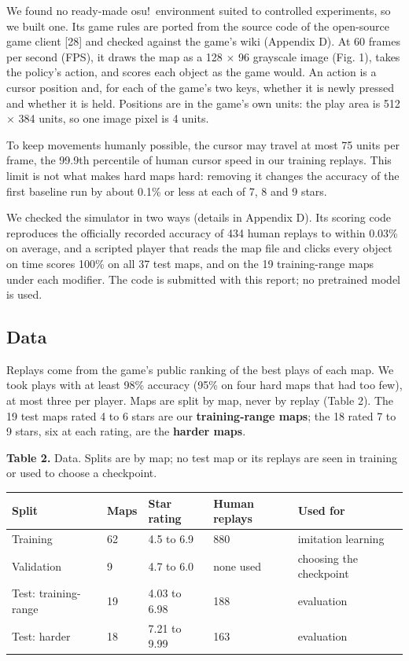 \documentclass[10pt,a4paper]{article}
\begin{document}
We found no ready-made osu!\ environment suited to controlled experiments, so we built one. Its game rules are ported from the source code of the open-source game client [28] and checked against the game's wiki (Appendix D). At 60 frames per second (FPS), it draws the map as a 128 $\times$ 96 grayscale image (Fig. 1), takes the policy's action, and scores each object as the game would. An action is a cursor position and, for each of the game's two keys, whether it is newly pressed and whether it is held. Positions are in the game's own units: the play area is 512 $\times$ 384 units, so one image pixel is 4 units.


To keep movements humanly possible, the cursor may travel at most 75 units per frame, the 99.9th percentile of human cursor speed in our training replays. This limit is not what makes hard maps hard: removing it changes the accuracy of the first baseline run by about 0.1\% or less at each of 7, 8 and 9 stars.


We checked the simulator in two ways (details in Appendix D). Its scoring code reproduces the officially recorded accuracy of 434 human replays to within 0.03\% on average, and a scripted player that reads the map file and clicks every object on time scores 100\% on all 37 test maps, and on the 19 training-range maps under each modifier. The code is submitted with this report; no pretrained model is used.


\subsection{Data}

Replays come from the game's public ranking of the best plays of each map. We took plays with at least 98\% accuracy (95\% on four hard maps that had too few), at most three per player. Maps are split by map, never by replay (Table 2). The 19 test maps rated 4 to 6 stars are our \textbf{training-range maps}; the 18 rated 7 to 9 stars, six at each rating, are the \textbf{harder maps}.


\begin{table}[!htb]\raggedright {\small \textbf{Table 2.} Data. Splits are by map; no test map or its replays are seen in training or used to choose a checkpoint.\par}\vspace{3pt}\centering \small\setlength{\tabcolsep}{5pt}\renewcommand{\arraystretch}{1.12}\begin{tabular}{lllll}\toprule
Split & Maps & Star rating & Human replays & Used for \\\midrule
Training & 62 & 4.5 to 6.9 & 880 & imitation learning \\
Validation & 9 & 4.7 to 6.0 & none used & choosing the checkpoint \\
Test: training-range & 19 & 4.03 to 6.98 & 188 & evaluation \\
Test: harder & 18 & 7.21 to 9.99 & 163 & evaluation \\\bottomrule\end{tabular}\end{table}
\end{document}
